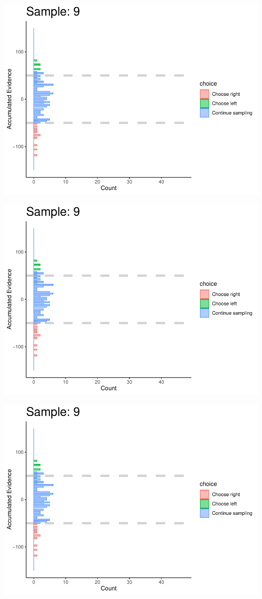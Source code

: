 \documentclass[
]{book}
\begin{document}
\begin{center}\includegraphics[width=0.8\linewidth]{LateNightBayes_files/figure-latex/fixed_check-82} \end{center}

\begin{center}\includegraphics[width=0.8\linewidth]{LateNightBayes_files/figure-latex/fixed_check-83} \end{center}

\begin{center}\includegraphics[width=0.8\linewidth]{LateNightBayes_files/figure-latex/fixed_check-84} \end{center}
\end{document}
